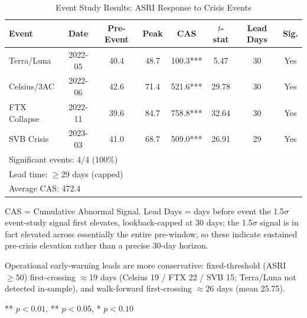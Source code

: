 \begin{table}[htbp]
\centering
\caption{Event Study Results: ASRI Response to Crisis Events}
\label{tab:event_study}
\small
\begin{tabular}{lccccccc}
\toprule
Event & Date & Pre-Event & Peak & CAS & $t$-stat & Lead Days & Sig. \\
\midrule
Terra/Luna & 2022-05 & 40.4 & 48.7 & 100.3*** & 5.47 & 30 & Yes \\
Celsius/3AC & 2022-06 & 42.6 & 71.4 & 521.6*** & 29.78 & 30 & Yes \\
FTX Collapse & 2022-11 & 39.6 & 84.7 & 758.8*** & 32.64 & 30 & Yes \\
SVB Crisis & 2023-03 & 41.0 & 68.7 & 509.0*** & 26.91 & 29 & Yes \\
\midrule
\multicolumn{8}{l}{Significant events: 4/4 (100\%)} \\
\multicolumn{8}{l}{Lead time: $\geq$29 days (capped)} \\
\multicolumn{8}{l}{Average CAS: 472.4} \\
\bottomrule
\end{tabular}
\begin{tablenotes}
\small
\item CAS = Cumulative Abnormal Signal. Lead Days = days before event the 1.5$\sigma$ event-study signal first elevates, lookback-capped at 30 days; the 1.5$\sigma$ signal is in fact elevated across essentially the entire pre-window, so these indicate sustained pre-crisis elevation rather than a precise 30-day horizon.
\item Operational early-warning leads are more conservative: fixed-threshold (ASRI $\geq 50$) first-crossing $\approx$19 days (Celsius 19 / FTX 22 / SVB 15; Terra/Luna not detected in-sample), and walk-forward first-crossing $\approx$26 days (mean 25.75).
\item *** $p<0.01$, ** $p<0.05$, * $p<0.10$
\end{tablenotes}
\end{table}
